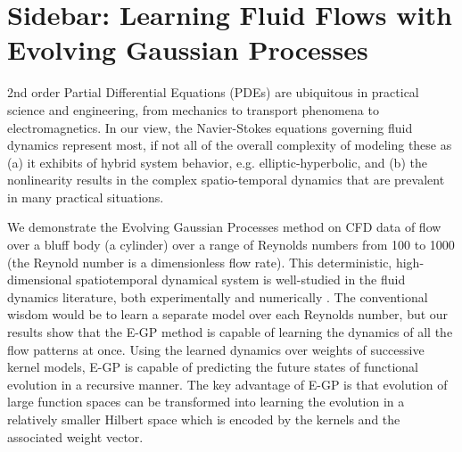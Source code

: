 \section[Learning Fluid Flows with Evolving Gaussian Processes]{Sidebar: Learning Fluid Flows with Evolving Gaussian Processes}\label{sb:cfd}

2nd order Partial Differential Equations (PDEs) are ubiquitous in practical science and engineering, from mechanics to transport phenomena to electromagnetics. In our view, the Navier-Stokes equations governing fluid dynamics represent most, if not all of the overall complexity of modeling these as (a) it exhibits of hybrid system behavior, e.g. elliptic-hyperbolic, and (b) the nonlinearity results in the complex spatio-temporal dynamics that are prevalent in many practical situations. %


We demonstrate the Evolving Gaussian Processes method on CFD data of flow over a bluff body (a cylinder) over a range of Reynolds numbers from 100 to 1000 (the Reynold number is a dimensionless flow rate). This deterministic, high-dimensional spatiotemporal dynamical system is well-studied in the fluid dynamics literature, both experimentally and numerically \cite{roshko1954cylinder, braza1986cylinder, rajani1986cylinder}. The conventional wisdom would be to learn a separate model over each Reynolds number, but our results show that the E-GP method is capable of learning the dynamics of all the flow patterns at once. Using the learned dynamics over weights of successive kernel models, E-GP is capable of predicting the future states of functional evolution in a recursive manner. The key advantage of E-GP is that evolution of large function spaces can be transformed into learning the evolution in a relatively smaller Hilbert space which is encoded by the kernels and the associated weight vector. %

